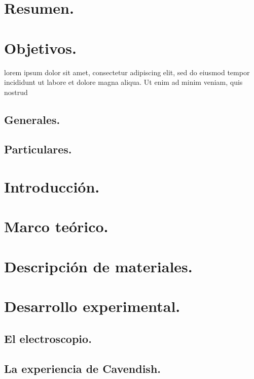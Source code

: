 \documentclass[spanish,10pt,a4paper,onecolumn]{article}
\begin{document}
\tableofcontents
\newpage




\section{Resumen.}


\begin{multicols}{2}
\section{Objetivos.}
lorem ipsum dolor sit amet, consectetur adipiscing elit, sed do eiusmod tempor incididunt ut labore et dolore magna aliqua. Ut enim ad minim veniam, quis nostrud
\subsection{Generales.}

\subsection{Particulares.}



\section{Introducción.}



\section{Marco teórico.}



\section{Descripción de materiales.}



\section{Desarrollo experimental.}

\subsection{El electroscopio.}

\subsection{La experiencia de Cavendish.}


\end{multicols}
\end{document}
